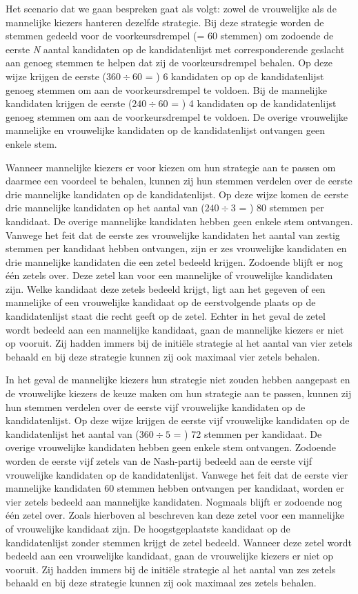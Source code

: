 Het scenario dat we gaan bespreken gaat als volgt: zowel de vrouwelijke als de mannelijke kiezers hanteren dezelfde strategie. Bij deze strategie worden de stemmen gedeeld voor de voorkeursdrempel (= 60 stemmen) om zodoende de eerste \textit{N} aantal kandidaten op de kandidatenlijst met corresponderende geslacht aan genoeg stemmen te helpen dat zij de voorkeursdrempel behalen. Op deze wijze krijgen de eerste ($360\div60$ = ) 6 kandidaten op op de kandidatenlijst genoeg stemmen om aan de voorkeursdrempel te voldoen. Bij de mannelijke kandidaten krijgen de eerste ($240\div60$ = ) 4 kandidaten op de kandidatenlijst genoeg stemmen om aan de voorkeursdrempel te voldoen. De overige vrouwelijke mannelijke en vrouwelijke kandidaten op de kandidatenlijst ontvangen geen enkele stem.

Wanneer mannelijke kiezers er voor kiezen om hun strategie aan te passen om daarmee een voordeel te behalen, kunnen zij hun stemmen verdelen over de eerste drie mannelijke kandidaten op de kandidatenlijst. Op deze wijze komen de eerste drie mannelijke kandidaten op het aantal van ($240\div3$ = ) 80 stemmen per kandidaat. De overige mannelijke kandidaten hebben geen enkele stem ontvangen. Vanwege het feit dat de eerste zes vrouwelijke kandidaten het aantal van zestig stemmen per kandidaat hebben ontvangen, zijn er zes vrouwelijke kandidaten en drie mannelijke kandidaten die een zetel bedeeld krijgen. Zodoende blijft er nog één zetels over. Deze zetel kan voor een mannelijke of vrouwelijke kandidaten zijn. Welke kandidaat deze zetels bedeeld krijgt, ligt aan het gegeven of een mannelijke of een vrouwelijke kandidaat op de eerstvolgende plaats op de kandidatenlijst staat die recht geeft op de zetel. Echter in het geval de zetel wordt bedeeld aan een mannelijke kandidaat, gaan de mannelijke kiezers er niet op vooruit. Zij hadden immers bij de initi\"{e}le strategie al het aantal van vier zetels behaald en bij deze strategie kunnen zij ook maximaal vier zetels behalen. 

In het geval de mannelijke kiezers hun strategie niet zouden hebben aangepast en de vrouwelijke kiezers de keuze maken om hun strategie aan te passen, kunnen zij hun stemmen verdelen over de eerste vijf vrouwelijke kandidaten op de kandidatenlijst. Op deze wijze krijgen de eerste vijf vrouwelijke kandidaten op de kandidatenlijst het aantal van ($360\div5$ = ) 72 stemmen per kandidaat. De overige vrouwelijke kandidaten hebben geen enkele stem ontvangen. Zodoende worden de eerste vijf zetels van de Nash-partij bedeeld aan de eerste vijf vrouwelijke kandidaten op de kandidatenlijst. Vanwege het feit dat de eerste vier mannelijke kandidaten 60 stemmen hebben ontvangen per kandidaat, worden er vier zetels bedeeld aan mannelijke kandidaten. Nogmaals blijft er zodoende nog één zetel over. Zoals hierboven al beschreven kan deze zetel voor een mannelijke of vrouwelijke kandidaat zijn. De hoogstgeplaatste kandidaat op de kandidatenlijst zonder stemmen krijgt de zetel bedeeld. Wanneer deze zetel wordt bedeeld aan een vrouwelijke kandidaat, gaan de vrouwelijke kiezers er niet op vooruit. Zij hadden immers bij de initi\"{e}le strategie al het aantal van zes zetels behaald en bij deze strategie kunnen zij ook maximaal zes zetels behalen. 

